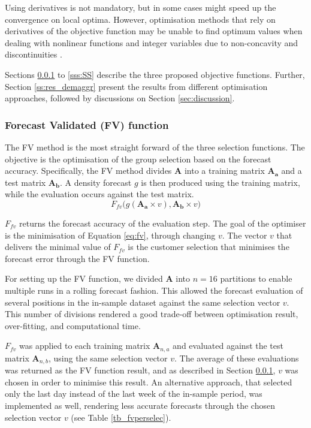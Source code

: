 \documentclass[preprint,3p,12pt,authoryear]{elsarticle}
\begin{document}
Using derivatives is not mandatory, but in some cases might speed up the convergence on local optima.
However, optimisation methods that rely on derivatives of the objective function may be unable to find optimum values when dealing with nonlinear functions and integer variables due to non-concavity and discontinuities \citep{genoud}.

Sections \ref{sss:FV} to \ref{sss:SS} describe the three proposed objective functions.
Further, Section \ref{ss:res_demaggr} present the results from different optimisation approaches, followed by discussions on Section \ref{sec:discussion}.

\subsubsection{Forecast Validated (FV) function}
\label{sss:FV}
The FV method is the most straight forward of the three selection functions.
The objective is the optimisation of the group selection based on the forecast accuracy.
Specifically, the FV method divides $\bm{A}$ into a training matrix $\bm{A_a}$ and a test matrix $\bm{A_b}$.
A density forecast $g$ is then produced using the training matrix, while the evaluation occurs against the test matrix.
\begin{equation}
   F_{fv}\big(g(\bm{A_a} \times v),\bm{A_b} \times v \big)
   \label{eq:fv}
\end{equation}

$F_{fv}$ returns the forecast accuracy of the evaluation step.
The goal of the optimiser is the minimisation of Equation \ref{eq:fv}, through changing $v$.
The vector $v$ that delivers the minimal value of $F_{fv}$ is the customer selection that minimises the forecast error through the FV function.

For setting up the FV function, we divided $\bm{A}$ into $n=16$ partitions to enable multiple runs in a rolling forecast fashion.
This allowed the forecast evaluation of several positions in the in-sample dataset against the same selection vector $v$.
This number of divisions rendered a good trade-off between optimisation result, over-fitting, and computational time.

$F_{fv}$ was applied to each training matrix $\bm{A}_{n,a}$ and evaluated against the test matrix $\bm{A}_{n,b}$, using the same selection vector $v$.
The average of these evaluations was returned as the FV function result, and as described in Section \ref{sss:FV}, $v$ was chosen in order to minimise this result.
An alternative approach, that selected only the last day instead of the last week of the in-sample period, was implemented as well, rendering less accurate forecasts through the chosen selection vector $v$ (see Table \ref{tb_fvperselec}).
\end{document}

